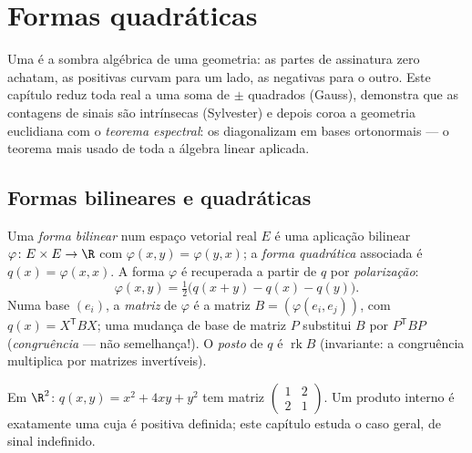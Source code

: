 \chapter{Formas quadráticas}\label{ch:b2:quadratic}

Uma  é a sombra algébrica de uma geometria: as partes de
assinatura zero achatam, as positivas curvam para um lado, as negativas para o
outro. Este capítulo reduz toda  real a uma soma de
$\pm$ quadrados (Gauss), demonstra que as contagens de sinais são intrínsecas
(Sylvester) e depois coroa a geometria euclidiana com o
\emph{teorema espectral}: os  diagonalizam em
bases ortonormais --- o teorema mais usado de toda a álgebra
linear aplicada.

\section{Formas bilineares e quadráticas}

\begin{definition}\label{def:b2:quadratic:def}
Uma \emph{forma bilinear } num espaço vetorial real $E$ é uma
aplicação bilinear $\varphi \colon E \times E \to \R$ com $\varphi(x, y) =
\varphi(y, x)$; a \emph{forma
quadrática} associada é $q(x) = \varphi(x, x)$. A forma
$\varphi$ é recuperada a partir de $q$ por
\emph{polarização}:
\[
\varphi(x, y) = \tfrac12\bigl(q(x + y) - q(x) - q(y)\bigr).
\]
Numa base $(e_i)$, a \emph{matriz} de $\varphi$ é a matriz 
$B = (\varphi(e_i, e_j))$, com $q(x) = X^{\mathsf T} B X$; uma mudança
de base de matriz $P$ substitui $B$ por $P^{\mathsf T} B P$
(\emph{congruência} --- não semelhança!).
O \emph{posto} de $q$ é $\operatorname{rk} B$ (invariante:
a congruência multiplica por matrizes invertíveis).
\end{definition}

\begin{example}
Em $\R^2$: $q(x, y) = x^2 + 4xy + y^2$ tem matriz $\begin{pmatrix}
1 & 2\\ 2 & 1\end{pmatrix}$. Um produto interno é exatamente uma
 cuja  é positiva definida;
este capítulo estuda o caso geral, de sinal indefinido.
\end{example}


